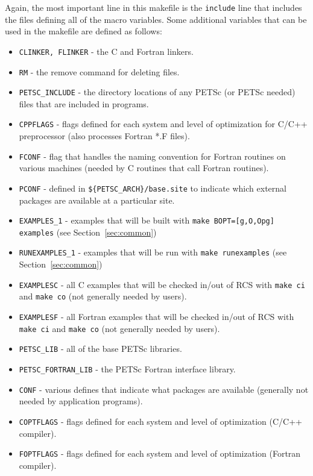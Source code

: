 Again, the most important line in this makefile is the {\tt include}
line that includes the files defining all of the macro variables.
Some additional variables that can be used in the makefile are defined
as follows:
\begin{itemize}
\item {\tt CLINKER, FLINKER} - the C and Fortran linkers. 
\item {\tt RM} - the remove command for deleting files.
\item {\tt PETSC\_INCLUDE} - the directory locations of any PETSc (or PETSc
            needed) files that are included in programs. 
\item {\tt CPPFLAGS} - flags defined for each system and level of 
                       optimization for C/C++ preprocessor (also processes Fortran *.F files).
\item {\tt FCONF} - flag that handles the naming convention for Fortran routines
                    on various machines (needed by C routines that call 
                    Fortran routines).
\item {\tt PCONF} - defined in {\tt \$\{PETSC\_ARCH\}/base.site} to 
            indicate which external packages are available at a particular site.
\item {\tt EXAMPLES\_1} - examples that will be built with
             {\tt make BOPT=[g,O,Opg] examples} (see Section~\ref{sec:common})
\item {\tt RUNEXAMPLES\_1} - examples that will be run with
             {\tt make runexamples} (see Section~\ref{sec:common})
\item {\tt EXAMPLESC} - all C examples that will be checked in/out of RCS
             with {\tt make ci} and {\tt make co} (not generally
             needed by users).
\item {\tt EXAMPLESF} - all Fortran examples that will be checked in/out of
             RCS with {\tt make ci} and {\tt make co} (not generally
             needed by users).
\item {\tt PETSC\_LIB} - all of the base PETSc libraries.
\item {\tt PETSC\_FORTRAN\_LIB} - the PETSc Fortran interface 
             library. 
\item {\tt CONF} - various defines that indicate what packages are available
           (generally not needed by application programs).
\item {\tt COPTFLAGS} - flags defined for each system and level of 
                        optimization (C/C++ compiler).
\item {\tt FOPTFLAGS} - flags defined for each system and level of 
                        optimization (Fortran compiler).
\end{itemize}
